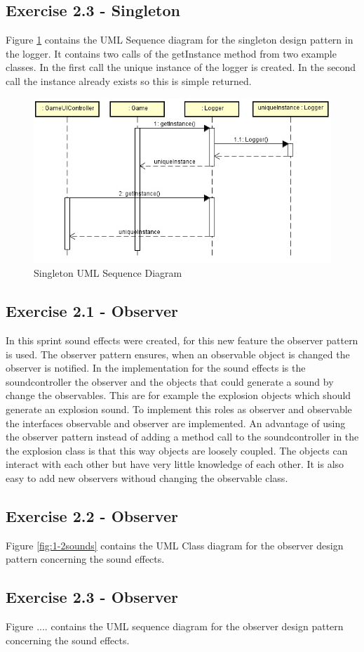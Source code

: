 \subsection{Exercise 2.3 - Singleton}
Figure \ref{fig:2-3singleton} contains the UML Sequence diagram for the singleton design pattern in the logger. It contains two calls of the getInstance method from two example classes. In the first call the unique instance of the logger is created. In the second call the instance already exists so this is simple returned. 

\begin{figure}[ht!]
\centering
\includegraphics[width=13cm]{loggerSequence.jpg}
\caption{Singleton UML Sequence Diagram}
\label{fig:2-3singleton}
\end{figure}

\subsection{Exercise 2.1 - Observer}
In this sprint sound effects were created, for this new feature the observer pattern is used. The observer pattern ensures, when an observable object is changed the observer is notified. In the implementation for the sound effects is the soundcontroller the observer and the objects that could generate a sound by change the observables. This are for example the explosion objects which should generate an explosion sound. To implement this roles as observer and observable the interfaces observable and observer are implemented. An advantage of using the observer pattern instead of adding a method call to the soundcontroller in the  the explosion class is that this way objects are loosely coupled. The objects can interact with each other but have very little knowledge of each other. It is also easy to add new observers withoud changing the observable class. 

\newpage

\subsection{Exercise 2.2 - Observer}
Figure \ref{fig:1-2sounds} contains the UML Class diagram for the observer design pattern concerning the sound effects.

\subsection{Exercise 2.3 - Observer}
Figure .... contains the UML sequence diagram for the observer design pattern concerning the sound effects.